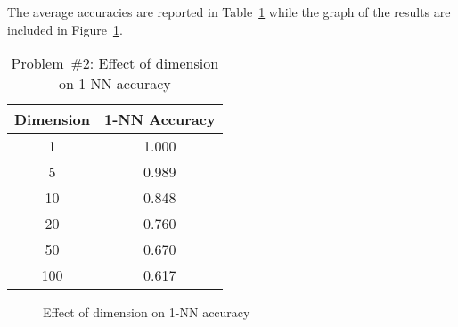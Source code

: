 The average accuracies are reported in Table~\ref{tab:P02:EffectAccuracy} while the graph of the results are included in Figure~\ref{fig:P02:KnnDimensionPlot}.

\begin{table}[h]
  \centering
  \caption{Problem~\#2: Effect of dimension on 1-NN accuracy}\label{tab:P02:EffectAccuracy}
  \begin{tabular}{|c|c|}
    \hline
    Dimension & 1-NN Accuracy \\\hline\hline
    1   & 1.000  \\\hline
    5   & 0.989  \\\hline
    10  & 0.848  \\\hline
    20  & 0.760  \\\hline
    50  & 0.670  \\\hline
    100 & 0.617  \\\hline
  \end{tabular}
\end{table}

\begin{figure}[h]
  \centering
  
  \caption{Effect of dimension on 1-NN accuracy}\label{fig:P02:KnnDimensionPlot}
\end{figure}

\FloatBarrier

